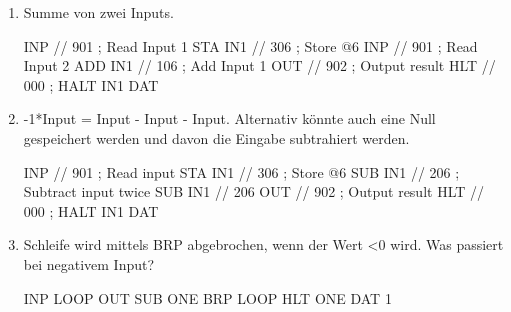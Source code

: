 \cprotEnv\begin{solution}
    \begin{enumerate}[label=\alph*)]
        \item Summe von zwei Inputs.
		\begin{assembly}
	INP     // 901  ; Read Input 1
	STA IN1 // 306  ; Store @6
	INP     // 901  ; Read Input 2
	ADD IN1 // 106  ; Add Input 1
	OUT     // 902  ; Output result
	HLT     // 000  ; HALT
IN1 DAT
        \end{assembly}
        
        \item  -1*Input = Input - Input - Input. Alternativ könnte auch eine Null gespeichert werden und davon die Eingabe subtrahiert werden.
			 \begin{assembly}
	INP     // 901  ; Read input
	STA IN1 // 306  ; Store @6
	SUB IN1 // 206  ; Subtract input twice
	SUB IN1 // 206
	OUT     // 902  ; Output result
	HLT     // 000  ; HALT
IN1 DAT
			\end{assembly}

		\item Schleife wird mittels BRP abgebrochen, wenn der Wert <0 wird. Was passiert bei negativem Input?
			\begin{assembly}
        INP
LOOP    OUT
		SUB ONE
		BRP LOOP
		HLT 
ONE     DAT 1
			\end{assembly}


\end{enumerate}
\end{solution}

